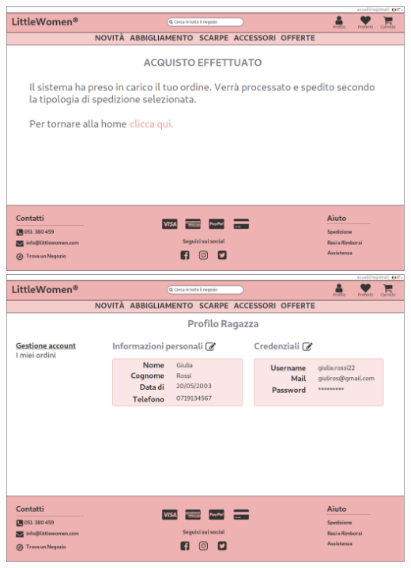 \documentclass[12pt,a4paper]{report}
\begin{document}
\includegraphics[width=\textwidth]{"Project Management Sources/Wireframe/WireFrame Screenshot/Desktop/12 - Acquisto Effettuato"}
\includegraphics[width=\textwidth]{"Project Management Sources/Wireframe/WireFrame Screenshot/Desktop/13 - Profilo Young"}
\end{document}
